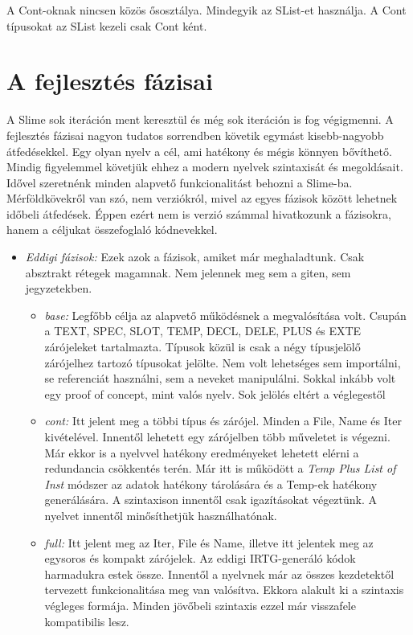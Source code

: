 {A Cont-oknak nincsen közös ősosztálya.
Mindegyik az SList-et használja.
A Cont típusokat az SList kezeli csak Cont ként.



\section{A fejlesztés fázisai}
\label{sec:SStatesOfDevelopment}
A Slime sok iteráción ment keresztül és még sok iteráción is fog végigmenni. 
A fejlesztés fázisai nagyon tudatos sorrendben követik egymást kisebb-nagyobb átfedésekkel.
Egy olyan nyelv a cél, ami hatékony és mégis könnyen bővíthető.
Mindig figyelemmel követjük ehhez a modern nyelvek szintaxisát és megoldásait.
Idővel szeretnénk minden alapvető funkcionalitást behozni a Slime-ba.
Mérföldkövekről van szó, nem verziókról, mivel az egyes fázisok között lehetnek időbeli átfedések.
Éppen ezért nem is verzió számmal hivatkozunk a fázisokra, hanem a céljukat összefoglaló kódnevekkel.

\begin{itemize}
\item \emph{Eddigi fázisok:}
Ezek azok a fázisok, amiket már meghaladtunk.
Csak absztrakt rétegek magamnak.
Nem jelennek meg sem a giten, sem jegyzetekben.
\begin{itemize}
\item \emph{base:}
Legfőbb célja az alapvető működésnek a megvalósítása volt. 
Csupán a TEXT, SPEC, SLOT, TEMP, DECL, DELE, PLUS és EXTE zárójeleket tartalmazta.
Típusok közül is csak a négy típusjelölő zárójelhez tartozó típusokat jelölte.
Nem volt lehetséges sem importálni, se referenciát használni, sem a neveket manipulálni.
Sokkal inkább volt egy proof of concept, mint valós nyelv. 
Sok jelölés eltért a véglegestől
\item \emph{cont:}
Itt jelent meg a többi típus és zárójel.
Minden a File, Name és Iter kivételével.
Innentől lehetett egy zárójelben több műveletet is végezni.
Már ekkor is a nyelvvel hatékony eredményeket lehetett elérni a redundancia csökkentés terén.
Már itt is működött a \textit{Temp Plus List of Inst} módszer az adatok hatékony tárolására és a Temp-ek
hatékony generálására.
A szintaxison innentől csak igazításokat végeztünk.
A nyelvet innentől minősíthetjük használhatónak.
\item \emph{full:}
Itt jelent meg az Iter, File és Name, illetve itt jelentek meg az egysoros és kompakt zárójelek.
Az eddigi IRTG-generáló kódok harmadukra estek össze.
Innentől a nyelvnek már az összes kezdetektől tervezett funkcionalitása meg van valósítva.
Ekkora alakult ki a szintaxis végleges formája.
Minden jövőbeli szintaxis ezzel már visszafele kompatibilis lesz.
\end{itemize}


\end{itemize}}
